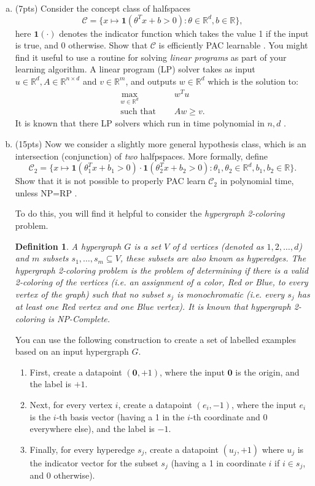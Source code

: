 \documentclass[11pt]{article}
\newcommand{\calC}{{\mathcal{C}}}
\newcommand{\blue}[1]{{\color{blue}#1}}
\newcommand{\R}{\mathbb{R}}
\newcommand{\indicator}{\mathbf{1}}
\newtheorem{definition}[theorem]{Definition}
\begin{document}
\begin{enumerate}[(a)] 
    \item (\blue{7pts}) Consider the concept class of halfspaces 
    \[
    \calC = \{ x \mapsto
 \indicator(\theta^T x + b>0): \theta \in \R^d, b \in \R \},
    \]
    here $\indicator(\cdot)$ denotes the indicator function which takes the value 1 if the input is true, and 0 otherwise.
Show that $\calC$ is efficiently PAC learnable . You might find it useful to use a routine for solving \emph{linear programs} as part of your learning algorithm. A linear program (LP) solver takes as input $u \in \R^d, A \in \R^{n \times d}$ and $ v \in \R^m$, and outputs $w \in \R^d$ which is the solution to:
\begin{align*}
    \max_{w \in \R^d}\quad & w^Tu\\
    \text{such that }\quad & Aw\ge v.
\end{align*}
It is known that there LP solvers which run in time polynomial in $n,d$ \cite{karmarkar1984new}.

\item (\blue{15pts}) Now we consider a slightly more general hypothesis class, which is an intersection (conjunction) of \emph{two} halfpspaces. More formally, define
\[
\calC_2 = \{ x \mapsto
 \indicator(\theta_1^T x + b_1>0) \cdot \indicator(\theta_2^T x + b_2>0): \theta_1, \theta_2 \in \R^d, b_1, b_2 \in \R \}.
\]
Show that it is not possible to properly PAC learn $\calC_2$ in polynomial time, unless NP=RP .

To do this, you will find it helpful to consider the \emph{hypergraph 2-coloring} problem. 

\begin{definition}
A hypergraph $G$ is a set $V$ of $d$ vertices (denoted as $1,2,\dots, d$) and $m$ subsets $s_1,\dots,s_m\subseteq V$, these subsets are also known as hyperedges. The hypergraph 2-coloring problem is the problem of determining if there is a valid 2-coloring of the vertices (i.e. an assignment of a color, Red or Blue, to every vertex of the graph) such that no subset $s_j$ is monochromatic (i.e. every $s_j$ has at least one Red vertex and one Blue vertex). It is known that hypergraph 2-coloring is NP-Complete.
\end{definition}

You can use the following construction to create a set of labelled examples based on an input hypergraph $G$. 

\begin{enumerate}
    \item First, create a datapoint $(\mathbf{0},+1)$, where the input $\mathbf{0}$ is the origin, and the label is $+1$.
    \item Next, for every vertex $i$, create a datapoint $(e_i,-1)$, where the input $e_i$ is the $i$-th basis vector (having a 1 in the $i$-th coordinate and 0 everywhere else), and the label is $-1$.
    \item Finally, for every hyperedge $s_j$, create a datapoint $(u_j,+1)$ where $u_j$ is the indicator vector for the subset $s_j$ (having a 1 in coordinate $i$ if $i\in s_j$, and 0 otherwise).
    \end{enumerate}
    

\end{enumerate}
\end{document}
